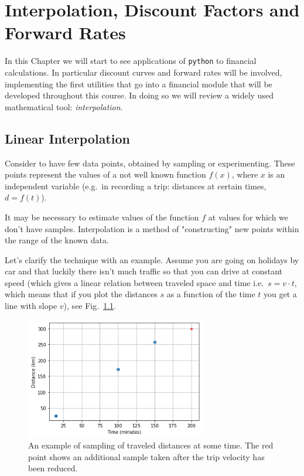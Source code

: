 \chapter{Interpolation, Discount Factors and Forward Rates}\label{interpolation---practical-lesson-3}

In this Chapter we will start to see applications of \texttt{python} to financial calculations.
In particular discount curves and forward rates will be involved, implementing the first utilities that go into a financial module that will be developed throughout this course.
In doing so we will review a widely used mathematical tool: \emph{interpolation}.

\section{Linear Interpolation}\label{linear-interpolation}

Consider to have few data points, obtained by sampling or experimenting. These points represent the values of a not well known function \(f(x)\), where \(x\) is an independent variable (e.g.~in recording a trip: distances at certain times, \(d = f(t)\)).

It may be necessary to estimate values of the function $f$ at values for which we don't have samples.
Interpolation is a method of "constructing" new points within the range of the known data.

Let's clarify the technique with an example.
Assume you are going on holidays by car and that luckily there isn't much traffic so that you can drive at constant speed (which gives a linear relation between traveled space and time i.e.~\(s = v \cdot t\), which means that if you plot the distances \(s\) as a function of the time \(t\) you get a line with slope \(v\)), see Fig.~\ref{fig:samples_for_interpolation}.

\begin{figure}
  \centering
  \includegraphics[width=0.7\textwidth]{figures/interp_example1.png}
  \caption{An example of sampling of traveled distances at some time. The red point shows an additional sample taken after the trip velocity has been reduced.}
  \label{fig:samples_for_interpolation}
\end{figure}

